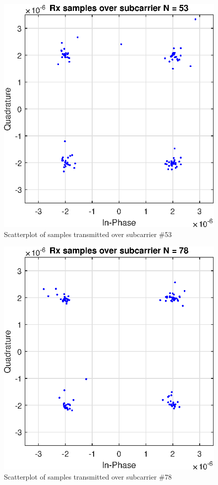 \documentclass[conference]{IEEEtran}
\begin{document}
\begin{appendices}
\begin{figure}[H]
    \centering
    \includegraphics[width=\linewidth]{images/ScatterN53.eps}
    \caption{Scatterplot of samples transmitted over subcarrier \#53}
    \label{N53}
\end{figure}

\begin{figure}[H]
    \centering
    \includegraphics[width=\linewidth]{images/ScatterN78.eps}
    \caption{Scatterplot of samples transmitted over subcarrier \#78}
    \label{N78}
\end{figure}


\end{appendices}
\end{document}
